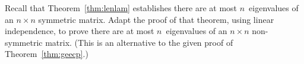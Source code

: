 \begin{exercise} \label{ex:lenlam} 
Recall that Theorem~\ref{thm:lenlam} establishes there are at most \(n\)~eigenvalues of an \(n\times n\) symmetric matrix.
Adapt the proof of that theorem, using linear independence, to prove there are at most \(n\)~eigenvalues of an \(n\times n\) non-symmetric matrix.
(This is an alternative to the given proof of Theorem~\ref{thm:geecp}.)
\end{exercise}




